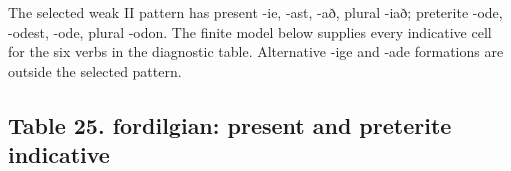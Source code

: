 The selected weak II pattern has present -ie, -ast, -að, plural -iað; preterite -ode, -odest, -ode, plural -odon. The finite model below supplies every indicative cell for the six verbs in the diagnostic table. Alternative -ige and -ade formations are outside the selected pattern.

\subsection*{Table 25. fordilgian: present and preterite indicative}

